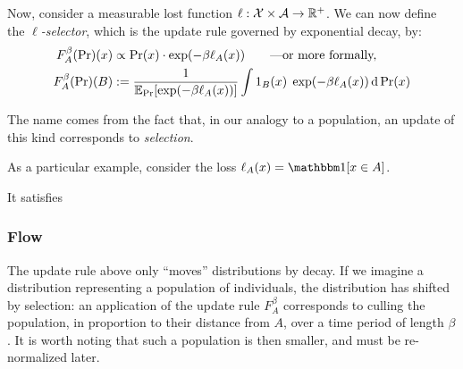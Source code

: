 \documentclass{article}
\begin{document}
Now, consider a measurable lost function
$\ell: \mathcal X\times\mathcal A \to \mathbb R^+$.
We can now define the \emph{$\ell$-selector}, which is the
update rule governed by exponential decay, by:
\def\cost#1#2{\ell_{#2}(#1)}
\begin{align*}
    F^\beta_A(\Pr)(x) &\propto \Pr(x) \cdot \exp(-\beta \cost xA)
        \qquad\text{---or more formally,}\\
    F^\beta_A(\Pr)(B) &:=  \frac{1}{\Ex_{\Pr}[\exp(-\beta \cost xA )]}
        \int 1_B(x) \; \exp(-\beta \cost xA ) \,\mathrm d\Pr(x)
\end{align*}

The name comes from the fact that, in our analogy to a population, an update of this kind corresponds to \emph{selection}.




%
%


As a particular example, consider the loss $\ell_A(x) = \mathbbm1[x \in A]$.

It satisfies



\subsubsection{Flow}
\def\vgrad{\boldsymbol\nabla}
The update rule above only ``moves'' distributions by decay. If we imagine a distribution representing a population of individuals, the distribution has shifted by selection: an application of the update rule $F_A^\beta$ corresponds to culling the population, in proportion to their distance from $A$, over a time period of length $\beta$.
It is worth noting that such a population is then smaller, and must be re-normalized later.
\end{document}
